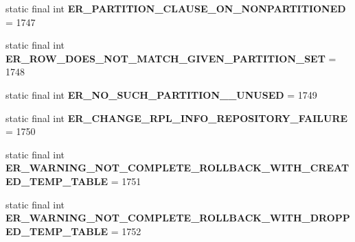 \begin{DoxyCompactItemize}
\item 
\mbox{\label{classcom_1_1mysql_1_1cj_1_1exceptions_1_1_mysql_error_numbers_a141a65af734ad254d106fbb960af7f69}} 
static final int {\bfseries E\+R\+\_\+\+P\+A\+R\+T\+I\+T\+I\+O\+N\+\_\+\+C\+L\+A\+U\+S\+E\+\_\+\+O\+N\+\_\+\+N\+O\+N\+P\+A\+R\+T\+I\+T\+I\+O\+N\+ED} = 1747
\item 
\mbox{\label{classcom_1_1mysql_1_1cj_1_1exceptions_1_1_mysql_error_numbers_af02cc5716ad1bf9d8bf8b2ad70d643b0}} 
static final int {\bfseries E\+R\+\_\+\+R\+O\+W\+\_\+\+D\+O\+E\+S\+\_\+\+N\+O\+T\+\_\+\+M\+A\+T\+C\+H\+\_\+\+G\+I\+V\+E\+N\+\_\+\+P\+A\+R\+T\+I\+T\+I\+O\+N\+\_\+\+S\+ET} = 1748
\item 
\mbox{\label{classcom_1_1mysql_1_1cj_1_1exceptions_1_1_mysql_error_numbers_aa320214d6db8279184fa34b29cd095c9}} 
static final int {\bfseries E\+R\+\_\+\+N\+O\+\_\+\+S\+U\+C\+H\+\_\+\+P\+A\+R\+T\+I\+T\+I\+O\+N\+\_\+\+\_\+\+U\+N\+U\+S\+ED} = 1749
\item 
\mbox{\label{classcom_1_1mysql_1_1cj_1_1exceptions_1_1_mysql_error_numbers_ac77cf2332eada0fc59940ad076ba4057}} 
static final int {\bfseries E\+R\+\_\+\+C\+H\+A\+N\+G\+E\+\_\+\+R\+P\+L\+\_\+\+I\+N\+F\+O\+\_\+\+R\+E\+P\+O\+S\+I\+T\+O\+R\+Y\+\_\+\+F\+A\+I\+L\+U\+RE} = 1750
\item 
\mbox{\label{classcom_1_1mysql_1_1cj_1_1exceptions_1_1_mysql_error_numbers_a1ab8e66cbb6d11ebcd086128f3f2ad4a}} 
static final int {\bfseries E\+R\+\_\+\+W\+A\+R\+N\+I\+N\+G\+\_\+\+N\+O\+T\+\_\+\+C\+O\+M\+P\+L\+E\+T\+E\+\_\+\+R\+O\+L\+L\+B\+A\+C\+K\+\_\+\+W\+I\+T\+H\+\_\+\+C\+R\+E\+A\+T\+E\+D\+\_\+\+T\+E\+M\+P\+\_\+\+T\+A\+B\+LE} = 1751
\item 
\mbox{\label{classcom_1_1mysql_1_1cj_1_1exceptions_1_1_mysql_error_numbers_a67687885d305627845434f4ddebd6e9c}} 
static final int {\bfseries E\+R\+\_\+\+W\+A\+R\+N\+I\+N\+G\+\_\+\+N\+O\+T\+\_\+\+C\+O\+M\+P\+L\+E\+T\+E\+\_\+\+R\+O\+L\+L\+B\+A\+C\+K\+\_\+\+W\+I\+T\+H\+\_\+\+D\+R\+O\+P\+P\+E\+D\+\_\+\+T\+E\+M\+P\+\_\+\+T\+A\+B\+LE} = 1752

\end{DoxyCompactItemize}
